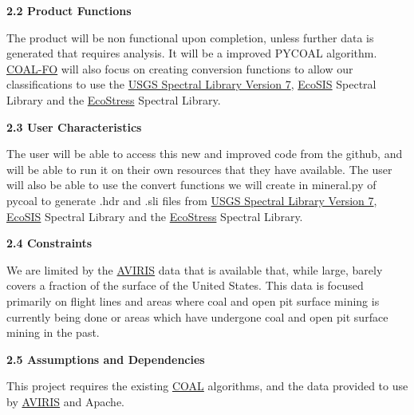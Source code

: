 \documentclass[a4paper,12pt]{article}
\begin{document}
\noindent \textbf{2.2 Product Functions}\newline


\noindent The product will be non functional upon completion, unless further data is generated that requires analysis. It will be a improved PYCOAL algorithm. \newline
\noindent \href{http://eecs.oregonstate.edu/capstone/submission/?page=preview\&pid=320}{COAL-FO} will also focus on creating conversion functions to allow our classifications to use the \href{https://speclab.cr.usgs.gov/spectral-lib.html}{USGS Spectral Library Version 7}, \href{https://ecosis.org/}{EcoSIS} Spectral Library and the \href{https://speclib.jpl.nasa.gov/}{EcoStress} Spectral Library.  \newline


\noindent \textbf{2.3 User Characteristics}\newline


\noindent The user will be able to access this new and improved code from the github, and will be able to run it on their own resources that they have available.\newline
\noindent The user will also be able to use the convert functions we will create in mineral.py of pycoal to generate .hdr and .sli files from \href{https://speclab.cr.usgs.gov/spectral-lib.html}{USGS Spectral Library Version 7}, \href{https://ecosis.org/}{EcoSIS} Spectral Library and the \href{https://speclib.jpl.nasa.gov/}{EcoStress} Spectral Library. \newline


\noindent \textbf{2.4 Constraints}\newline

\noindent We are limited by the \href{https://aviris.jpl.nasa.gov/}{AVIRIS} data that is available that, while large, barely covers a fraction of the surface of the United States. This data is focused primarily on flight lines and areas where coal and open pit surface mining is currently being done or areas which have undergone coal and open pit surface mining in the past. \newline


\noindent \textbf{2.5 Assumptions and Dependencies}\newline


\noindent This project requires the existing \href{https://capstone-coal.github.io/}{COAL} algorithms, and the data provided to use by \href{https://aviris.jpl.nasa.gov/}{AVIRIS} and Apache.\newline
\end{document}
